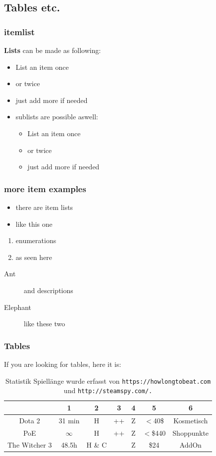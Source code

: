 \documentclass[10pt,a4paper]{article}
\begin{document}
\subsection{Tables etc.}
\subsubsection{itemlist}
\textbf{Lists} can be made as following:
\begin{itemize}
\item List an item once
\item or twice
\item just add more if needed
\item sublists are possible aswell:
\begin{itemize}
\item List an item once \label{itm:ListAnItemOnce}
\item or twice
\item just add more if needed
\end{itemize}
\end{itemize}

\subsubsection{more item examples}
\begin{itemize}
\item there are item lists
\item like this one
\end{itemize}
\begin{enumerate}
\item enumerations
\item as seen here
\end{enumerate}
\begin{description}
\item [Ant] and descriptions
\item [Elephant] like these two
\end{description}

\subsubsection{Tables}
If you are looking for tables, here it is:
\begin{table}[H]
\centering
\begin{tabular}{ |c|c|c|c|c|c|c| }
\hline
 & 1 & 2 & 3 & 4 & 5 & 6 \\
\hline
Dota 2 & 31 min & H & ++ & Z & $<$40\$ & Kosmetisch \\
\hline
PoE & $\infty$ & H & ++ & Z & $<$\$440 & Shoppunkte \\
\hline
The Witcher 3 & 48.5h & H \& C &  & Z & \$24 & AddOn \\
\hline
\end{tabular}
\caption{Statistik Spiellänge wurde erfasst von \texttt{https://howlongtobeat.com} und \texttt{http://steamspy.com/.}}
\label{table:1}
\end{table}
\end{document}
